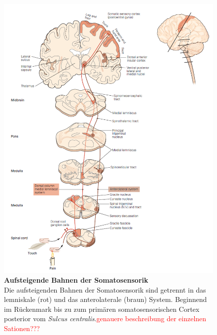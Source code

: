 \documentclass[12pt,a4paper,pdftex]{article}
\begin{document}
\begin{figure}
    \centering
    \includegraphics{pictures/somatosensory/pathway_somatosensory2.png}
    \caption[Aufsteigende Bahnen der Somatosensorik]{\textbf{Aufsteigende Bahnen der Somatosensorik}\\
    Die aufsteigenden Bahnen der Somatosensorik sind getrennt in das lemniskale (rot) und das anterolaterale (braun) System. Beginnend im Rückenmark bis zu zum primären somatosensorischen Cortex posterior vom \textit{Sulcus centralis}.\textcolor{red}{genauere beschreibung der einzelnen Sationen???}\\
    \cite[Kap.~22]{kandel2013principles}}
    \label{fig:somato_pathway}
\end{figure}
    
\end{document}
